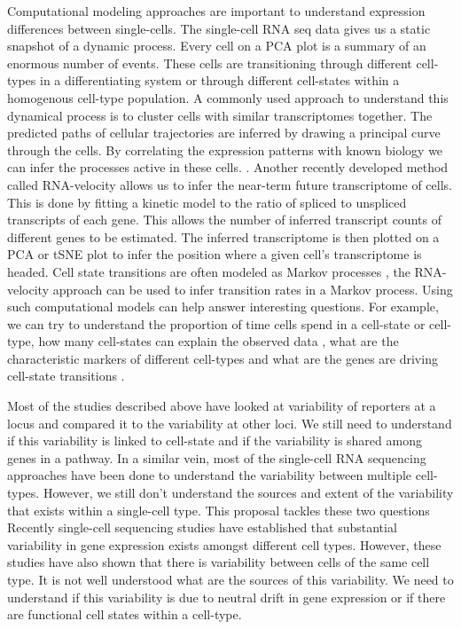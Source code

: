 Computational modeling approaches are important to understand expression differences between single-cells. The single-cell RNA seq data gives us a static snapshot of a dynamic process. Every cell on a PCA plot is a summary of an enormous number of events. These cells are transitioning through different cell-types in a differentiating system or through different cell-states within a homogenous cell-type population. A commonly used approach to understand this dynamical process is to cluster cells with similar transcriptomes together. The predicted paths of cellular trajectories are inferred by drawing a principal curve through the cells. By correlating the expression patterns with known biology we can infer the processes active in these cells. \cite{trapnell_dynamics_2014}. Another recently developed method called RNA-velocity allows us to infer the near-term future transcriptome of cells. This is done by fitting a kinetic model to the ratio of spliced to unspliced transcripts of each gene. This allows the number of inferred transcript counts of different genes to be estimated. The inferred transcriptome is then plotted on a PCA or tSNE plot to infer the position where a given cell's transcriptome is headed.  \cite{manno_rna_2018} Cell state transitions are often modeled as Markov processes \cite{stumpf_stem_2017}, the RNA-velocity approach can be used to infer transition rates in a Markov process. Using such computational models can help answer interesting questions. For example, we can try to understand the proportion of time cells spend in a cell-state or cell-type, how many cell-states can explain the observed data  \cite{chang_transcriptome-wide_2008}, what are the characteristic markers of different cell-types and what are the genes are driving cell-state transitions \cite{furchtgott_discovering_2017}.

Most of the studies described above have looked at variability of reporters at a locus and compared it to the variability at other loci. We still need to understand if this variability is linked to cell-state and if the variability is shared among genes in a pathway. In a similar vein, most of the single-cell RNA sequencing approaches have been done to understand the variability between multiple cell-types. However, we still don't understand the sources and extent of the variability that exists within a single-cell type. This proposal tackles these two questions
Recently single-cell sequencing studies have established that substantial variability in gene expression exists amongst different cell types. However, these studies have also shown that there is variability between cells of the same cell type. It is not well understood what are the sources of this variability. We need to understand if this variability is due to neutral drift in gene expression or if there are functional cell states within a cell-type.
